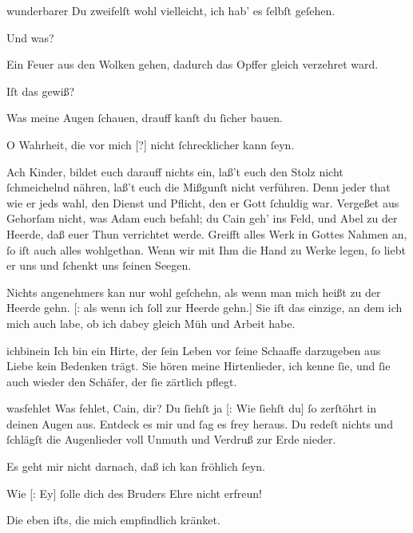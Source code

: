 \documentclass[tocstyle=ref-genre]{ees}
\begin{document}
{\begin{movement}{wunderbarer}
  \voice[Eva]
  Du zweifelſt wohl vielleicht, ich hab’ es ſelbſt geſehen.

  \voice[Cain]
  Und was?

  \voice[Eva]
  Ein Feuer aus den Wolken gehen,
  dadurch das Opffer gleich verzehret ward.

  \voice[Cain]
  Iſt das gewiß?

  \voice[Eva]
  Was meine Augen ſchauen,
  drauff kanſt du ſicher bauen.

  \voice[Cain]
  O Wahrheit, die vor mich [?] nicht ſchrecklicher kann ſeyn.

  \voice[Eva]
  Ach Kinder, bildet euch darauff nichts ein,
  laß’t euch den Stolz nicht ſchmeichelnd nähren,
  laß’t euch die Mißgunſt nicht verführen.
  Denn jeder that wie er jeds wahl,
  den Dienst und Pflicht,
  den er Gott ſchuldig war. Vergeßet aus Gehorſam nicht,
  was Adam euch befahl;
  du Cain geh’ ins Feld, und Abel zu der Heerde,
  daß euer Thun verrichtet werde.
  Greifft alles Werk in Gottes Nahmen an,
  ſo iſt auch alles wohlgethan.
  Wenn wir mit Ihm die Hand zu Werke legen,
  ſo liebt er uns und ſchenkt uns ſeinen Seegen.

  \voice[Abel]
  Nichts angenehmers kan nur wohl geſchehn,
  als wenn man mich heißt zu der Heerde gehn.
  [: als wenn ich ſoll zur Heerde gehn.]
  Sie iſt das einzige, an dem ich mich auch labe,
  ob ich dabey gleich Müh und Arbeit habe.
\end{movement}

\begin{movement}{ichbinein}
  \voice[Abel]
  Ich bin ein Hirte, der ſein Leben
  vor ſeine Schaaffe darzugeben
  aus Liebe kein Bedenken trägt.
  Sie hören meine Hirtenlieder,
  ich kenne ſie, und ſie auch wieder
  den Schäfer, der ſie zärtlich pflegt.
\end{movement}

\begin{movement}{wasfehlet}
  \voice[Eva]
  Was fehlet, Cain, dir?
  Du ſiehſt ja [: Wie ſiehſt du] ſo zerſtöhrt in deinen Augen aus.
  Entdeck es mir
  und ſag es frey heraus.
  Du redeſt nichts und ſchlägſt die Augenlieder
  voll Unmuth und Verdruß zur Erde nieder.

  \voice[Cain]
  Es geht mir nicht darnach, daß ich kan fröhlich ſeyn.

  \voice[Eva]
  Wie [: Ey] ſolle dich des Bruders Ehre nicht erfreun!

  \voice[Cain]
  Die eben iſts, die mich empfindlich kränket.


\end{movement}}
\end{document}
